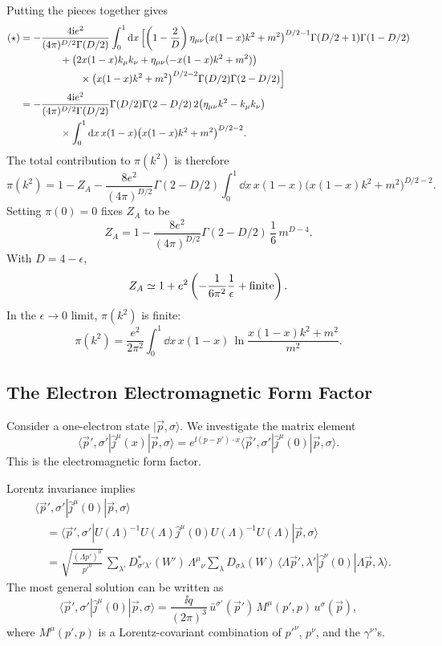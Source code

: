 Putting the pieces together gives
\[
\begin{aligned}
  (\star)
  &=
  -\frac{4\mathrm{i} e^2}{(4\pi)^{D/2}\Gamma(D/2)}
  \int_0^1\mathrm{d} x\,
  \Bigl[
    \left(1-\frac2D\right)\eta_{\mu\nu}
    \bigl(x(1-x)k^2+m^2\bigr)^{D/2-1}
    \Gamma(D/2+1)\Gamma(1-D/2)
\\
  &\qquad\qquad
    +\bigl(2x(1-x)k_\mu k_\nu
    +\eta_{\mu\nu}(-x(1-x)k^2+m^2)\bigr)
\\
  &\qquad\qquad\qquad\times
    \bigl(x(1-x)k^2+m^2\bigr)^{D/2-2}
    \Gamma(D/2)\Gamma(2-D/2)
  \Bigr]
\\
  &=
  -\frac{4\mathrm{i} e^2}{(4\pi)^{D/2}\Gamma(D/2)}
  \Gamma(D/2)\Gamma(2-D/2)\,
  2\bigl(\eta_{\mu\nu}k^2-k_\mu k_\nu\bigr)
\\
  &\qquad\qquad\times
  \int_0^1\mathrm{d} x\,x(1-x)
  \bigl(x(1-x)k^2+m^2\bigr)^{D/2-2}.
\end{aligned}
\]
The total contribution to \(\pi(k^2)\) is therefore
\[
  \pi(k^2)
  =
  1-Z_A
  -
  \frac{8e^2}{(4\pi)^{D/2}}\Gamma(2-D/2)
  \int_0^1\dd x\,x(1-x)
  \bigl(x(1-x)k^2+m^2\bigr)^{D/2-2}.
\]
Setting \(\pi(0)=0\) fixes \(Z_A\) to be
\[
  Z_A
  =
  1-
  \frac{8e^2}{(4\pi)^{D/2}}\Gamma(2-D/2)\,
  \frac16\,m^{D-4}.
\]
With \(D=4-\epsilon\),
\[
  Z_A
  \simeq
  1+e^2\left(-\frac{1}{6\pi^2}\frac1\epsilon+\hbox{finite}\right).
\]
In the \(\epsilon\to0\) limit, \(\pi(k^2)\) is finite:
\[
  \pi(k^2)
  =
  \frac{e^2}{2\pi^2}
  \int_0^1\dd x\,x(1-x)\,
  \ln\frac{x(1-x)k^2+m^2}{m^2}.
\]

\subsection{The Electron Electromagnetic Form Factor}

Consider a one-electron state \(|\vec p,\sigma\rangle\).  We investigate
the matrix element
\[
  \langle \vec p',\sigma'|\widehat j^\mu(x)|\vec p,\sigma\rangle
  =
  e^{\ii(p-p')\cdot x}
  \langle \vec p',\sigma'|\widehat j^\mu(0)|\vec p,\sigma\rangle .
\]
This is the electromagnetic form factor.

Lorentz invariance implies
\[
\begin{aligned}
  &\langle \vec p',\sigma'|\widehat j^\mu(0)|\vec p,\sigma\rangle
\\
  &\quad =
  \langle \vec p',\sigma'|
    U(\Lambda)^{-1}U(\Lambda)\widehat j^\mu(0)U(\Lambda)^{-1}U(\Lambda)
  |\vec p,\sigma\rangle
\\
  &\quad =
  \sqrt{\frac{(\Lambda p')^0}{p'^0}}\,
  \sum_{\lambda'}D_{\sigma'\lambda'}^\ast(W')\,
  \Lambda^\mu{}_\nu
  \sum_\lambda D_{\sigma\lambda}(W)\,
  \langle \Lambda\vec p',\lambda'|
    \widehat j^\nu(0)
  |\Lambda\vec p,\lambda\rangle .
\end{aligned}
\]
The most general solution can be written as
\[
  \langle \vec p',\sigma'|\widehat j^\mu(0)|\vec p,\sigma\rangle
  =
  \frac{\ii q}{(2\pi)^3}\,
  \bar u^{\sigma'}(\vec p')\,M^\mu(p',p)\,u^\sigma(\vec p),
\]
where \(M^\mu(p',p)\) is a Lorentz-covariant combination of
\(p'^\nu\), \(p^\nu\), and the \(\gamma^\nu\)'s.

